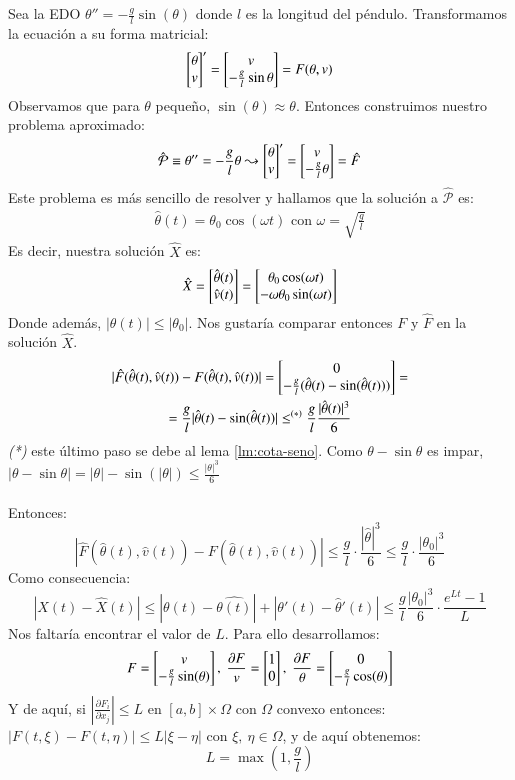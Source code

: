 \begin{eg}
    Sea la EDO $\theta'' = -\frac{g}{l}\sin(\theta)$ donde $l$ es la longitud del péndulo. Transformamos la ecuación a su forma matricial:
    $$
        \mx{\theta\\v}' = \mx{v\\-\frac{g}{l}\sin{\theta}} = F(\theta, v)
    $$
    Observamos que para $\theta$ pequeño, $\sin(\theta) \approx \theta$. Entonces construimos nuestro problema aproximado:
    $$
        \hat{\mathcal{P}} \equiv \theta''=-\frac{g}{l} \theta \leadsto \mx{\theta\\v}'=\mx{v\\-\frac{g}{l}\theta} = \hat{F}
    $$
    Este problema es más sencillo de resolver y hallamos que la solución a $\hat{\mathcal{P}}$ es:
    \begin{gather*}
        \hat{\theta}(t)=\theta_0\cos(\omega t) \text{ con }\omega = \sqrt{\frac{g}{l}}
    \end{gather*}
    Es decir, nuestra solución $\hat{X}$ es:
    $$
        \hat{X} = \mx{\hat{\theta}(t)\\ \hat{v}(t)} = \mx{\theta_0\cos(\omega t)\\-\omega \theta_0 \sin(\omega t)}
    $$
    Donde además, $|\theta(t)| \leq |\theta_0|$. Nos gustaría comparar entonces $F$ y $\hat{F}$ en la solución $\hat{X}$.
    \begin{gather*}
        |\hat{F}(\hat{\theta}(t), \hat{v}(t)) - F(\hat{\theta}(t), \hat{v}(t))| = \mx{0\\-\frac{g}{l}(\hat{\theta}(t) - \sin(\hat{\theta}(t)))}=\\
        = \frac{g}{l} |\hat{\theta}(t) - \sin(\hat{\theta}(t))| \leq^{(*)} \frac{g}{l}\frac{|\hat{\theta}(t)|^3}{6}
    \end{gather*}
    \textit{(*)} este último paso se debe al lema \ref{lm:cota-seno}. Como $\theta - \sin\theta$ es impar, $|\theta-\sin\theta| = |\theta| - \sin(|\theta|) \leq \frac{|\theta|^3}{6}$\\\\
    Entonces:
    $$
        |\hat{F}(\hat{\theta}(t), \hat{v}(t)) - F(\hat{\theta}(t), \hat{v}(t))| \leq \frac{g}{l} \cdot \frac{|\hat{\theta}|^3}{6} \leq \frac{g}{l} \cdot \frac{|\theta_0|^3}{6}
    $$
    Como consecuencia:
    $$
        |X(t) - \hat{X}(t)| \leq |\theta(t) - \hat{\theta(t)}| + |\theta'(t) - \hat{\theta}'(t)| \leq \frac{g}{l}\frac{|\theta_0|^3}{6} \cdot \frac{e^{Lt} - 1}{L}
    $$
    Nos faltaría encontrar el valor de $L$. Para ello desarrollamos:
    $$
        F = \mx{v\\-\frac{g}{l}\sin(\theta)},\ \frac{\partial F}{v} = \mx{1\\0},\ \frac{\partial F}{\theta} = \mx{0\\-\frac{g}{l}\cos(\theta)}
    $$
    Y de aquí, si $\left|\frac{\partial F_i}{\partial x_j}\right| \leq L$ en $[a, b]\times \Omega$ con $\Omega$ convexo entonces:
    $|F(t, \xi) - F(t, \eta)| \leq L |\xi - \eta|$ con $\xi,\ \eta \in \Omega$, y de aquí obtenemos:
    $$
        L = \max\left(1, \frac{g}{l}\right)
    $$

\end{eg}

